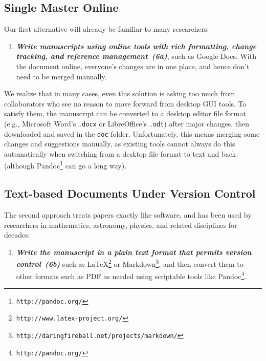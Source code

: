 \documentclass[10pt,letterpaper]{article}
\newcommand{\withurl}[2]{{#1}\footnote{{\texttt{#2}}}}
\newcommand{\practice}[2]{\textbf{\emph{{#2}~({#1})}}}
\begin{document}
\subsection*{Single Master Online}

Our first alternative will already be familiar to many researchers:

\begin{enumerate}

\item
  \practice{6a}{Write manuscripts using online tools with rich
    formatting, change tracking, and reference management}, such as
  Google Docs. With the document online, everyone's
  changes are in one place, and hence don't need to be merged
  manually.


\end{enumerate}

We realize that in many cases, even this solution is asking too much
from collaborators who see no reason to move forward from desktop GUI
tools. To satisfy them, the manuscript can be converted to a desktop
editor file format (e.g., Microsoft Word's \texttt{.docx} or
LibreOffice's \texttt{.odt}) after major changes, then downloaded and
saved in the \texttt{doc} folder. Unfortunately, this means merging
some changes and suggestions manually, as existing tools cannot always
do this automatically when switching from a desktop file format to
text and back (although \withurl{Pandoc}{http://pandoc.org/} can go a
long way).

\subsection*{Text-based Documents Under Version Control}

The second approach treats papers exactly like software, and has been
used by researchers in mathematics, astronomy, physics, and related
disciplines for decades:

\begin{enumerate}

\item
  \practice{6b}{Write the manuscript in a plain text format that permits
    version control} such as
  \withurl{LaTeX}{http://www.latex-project.org/} or
  \withurl{Markdown}{http://daringfireball.net/projects/markdown/},
  and then convert them to other formats such as PDF as needed using
  scriptable tools like \withurl{Pandoc}{http://pandoc.org/}.


\end{enumerate}
\end{document}
